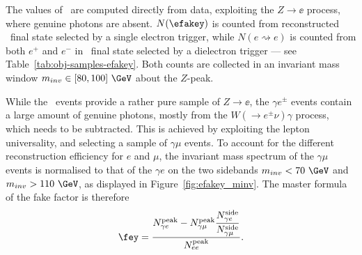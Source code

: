 The values of \fey\ are computed directly from data, exploiting the $Z\to\ee$ process, where genuine photons are absent. 
$N(\efakey)$ is counted from reconstructed \ye\ final state selected by a single electron trigger, while $N(e\rightsquigarrow e)$ is counted from both $e^+$ and $e^-$ in \ee\ final state selected by a dielectron trigger --- see Table~\ref{tab:obj-samples-efakey}. Both counts are collected in an invariant mass window $m_{inv}\in[80,100]~\GeV$ about the $Z$-peak.


While the \ee\ events provide a rather pure sample of $Z\to\ee$, the $\gamma e^{\pm}$ events contain a large amount of genuine photons, mostly from the $W(\to e^{\pm}\nu)\gamma$ process, which needs to be subtracted. This is achieved by exploiting the lepton universality, and selecting a sample of $\gamma\mu$ events. To account for the different reconstruction efficiency for $e$ and $\mu$, the invariant mass spectrum of the $\gamma\mu$ events is normalised to that of the $\gamma e$ on the two sidebands $m_{inv}<70~\GeV$ and $m_{inv}>110~\GeV$, as displayed in Figure~\ref{fig:efakey_minv}. 
The master formula of the fake factor is therefore
\begin{equation}
\fey=\dfrac{N_{\gamma e}^\mathrm{peak}-N_{\gamma\mu}^\mathrm{peak}\dfrac{N_{\gamma e}^\mathrm{side}}{N_{\gamma\mu}^\mathrm{side}}}{N_{ee}^\mathrm{peak}}.
\label{eq:calc-fey}
\end{equation}

